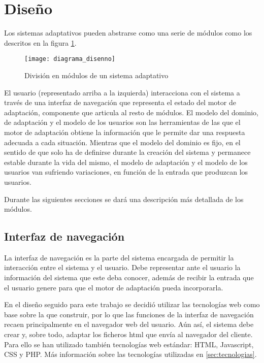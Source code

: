 
\section{Diseño}

Los sistemas adaptativos pueden abstrarse como una serie de módulos como los descritos en la figura \ref{fig:diagrama_disenno}. 

\begin{figure}[htp!]
	\centering
	\texttt{[image: diagrama\_disenno]}
	\caption{División en módulos de un sistema adaptativo}
	\label{fig:diagrama_disenno}
\end{figure}

El usuario (representado arriba a la izquierda) interacciona con el sistema a través de una interfaz de navegación que representa el estado del motor de adaptación, componente que articula al resto de módulos. El modelo del dominio, de adaptación y el modelo de los usuarios son las herramientas de las que el motor de adaptación obtiene la información que le permite dar una respuesta adecuada a cada situación. Mientras que el modelo del dominio es fijo, en el sentido de que solo ha de definirse durante la creación del sistema y permanece estable durante la vida del mismo, el modelo de adaptación y el modelo de los usuarios van sufriendo variaciones, en función de la entrada que produzcan los usuarios.

Durante las siguientes secciones se dará una descripción más detallada de los módulos.

\subsection{Interfaz de navegación}

La interfaz de navegación es la parte del sistema encargada de permitir la interacción entre el sistema y el usuario. Debe representar ante el usuario la información del sistema que este deba conocer, además de recibir la entrada que el usuario genere para que el motor de adaptación pueda incorporarla.

En el diseño seguido para este trabajo se decidió utilizar las tecnologías web como base sobre la que construir, por lo que las funciones de la interfaz de navegación recaen principalmente en el navegador web del usuario. Aún así, el sistema debe crear y, sobre todo, adaptar los ficheros html que envía al navegador del cliente. Para ello se han utilizado también tecnologías web estándar: HTML, Javascript, CSS y PHP. Más información sobre las tecnologías utilizadas en \ref{sec:tecnologias}.

